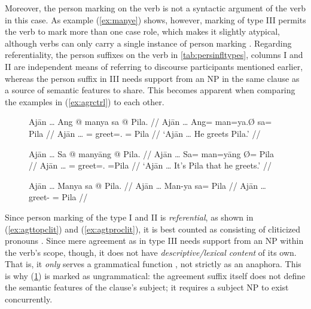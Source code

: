 Moreover, the person marking on the verb is not a syntactic argument of the
verb in this case. As example (\ref{ex:manye}) shows, however, marking of type
III permits the verb to mark more than one case role, which makes it slightly
atypical, although verbs can only carry a single instance of person marking
\citep[103]{corbett2006}. Regarding referentiality, the person suffixes on the
verb in \autoref{tab:persinfltypes}, columns I and II are independent means of
referring to discourse participants mentioned earlier, whereas the person
suffix in III needs support from an NP in the same clause as a source of
semantic features to share. This becomes apparent when comparing the examples
in (\ref{ex:agrctrl}) to each other.

\begin{figure}[h]
\pex\label{ex:agrctrl} %
\a\label{ex:agttopclit}\begingl
	\gla Ajān … Ang @ manya sa @ Pila. //
	\glb Ajān … Ang= man=ya.Ø sa= ​Pila //
	\glc Ajān … \AgtT{}= greet=\TsgM{}.\Top{} \Parg{}= ​Pila //
	\glft `Ajān … He greets Pila.' //
\endgl

\a\label{ex:agtproclit}\begingl
	\gla Ajān … Sa @ manyāng {} @ Pila. //
	\glb Ajān … Sa= man=yāng Ø= Pila //
	\glc Ajān … \PatT{}= greet=\TsgM{}.\Aarg{} \Top{}= ​Pila //
	\glft `Ajān … It's Pila that he greets.' //
\endgl

\a\label{ex:wrongagr}\ljudge* \begingl
	\gla Ajān … Manya sa @ Pila. //
	\glb Ajān … Man-ya sa= ​Pila //
	\glc Ajān … greet-\TsgM{} \Parg{}= ​Pila //
\endgl
\xe
\end{figure}

Since person marking of the type I and II is \emph{referential}, as shown in
(\ref{ex:agttopclit}) and (\ref{ex:agtproclit}), it is best counted as
consisting of cliticized pronouns \citep[103]{corbett2006}. Since mere
agreement as in type III needs support from an NP within the verb's scope,
though, it does not have \emph{descriptive/lexical content} of its own. That
is, it \emph{only} serves a grammatical function \citep[104]{corbett2006}, not
strictly as an anaphora. This is why (\ref{ex:wrongagr}) is marked as
ungrammatical: the agreement suffix  itself does not define the
semantic features of the clause's subject; it requires a subject NP to exist
concurrently.

